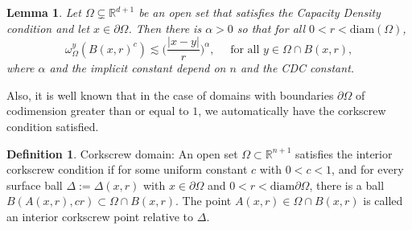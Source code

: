 \documentclass{article}
\newcounter{defn}
\newcounter{lem}
\theoremstyle{plain}
\theoremstyle{plain}
\newcommand{\R}{\mathbb{R}}
\newtheorem{lemma}[theorem]{Lemma}
\theoremstyle{definition}
\newtheorem{definition}[defn]{Definition}
\theoremstyle{plain}
\begin{document}
\begin{lemma} \label{l:holder}
Let $\Omega\subsetneq \R^{d+1}$ be an open set that satisfies the Capacity Density condition and let $x\in \partial\Omega$. Then there is $\alpha>0$ so that for all $0<r<\text{diam}(\Omega)$,
\begin{equation}\label{e:holder}
 \omega_{\Omega}^{y}({B}(x,r)^{c})\lesssim \Big({\frac{|x-y|}{r}}\Big)^{\alpha},\quad \mbox{ for all } y\in \Omega\cap B(x,r),
 \end{equation}
where $\alpha$ and the implicit constant depend on $n$ and the CDC constant.
\end{lemma}

Also, it is well known that in the case of domains with boundaries $\partial\Omega$ of codimension greater than or equal to $1$, we automatically have the corkscrew condition satisfied.

\begin{definition}\label{def1}
    Corkscrew domain:  An open set $\Omega\subset \R^{n+1}$ satisfies the interior corkscrew condition if for some uniform constant $c$ with $0<c<1$, and for every surface ball $\Delta:=\Delta(x,r)$ with $x\in \partial \Omega$ and $0<r<\text{diam}\partial\Omega$, there is a ball $B(A(x,r),cr)\subset \Omega\cap B(x,r)$. The point $A(x,r)\in \Omega\cap B(x,r)$
 is called an interior corkscrew point relative to $\Delta$.
 \end{definition}



%
%
%
\end{document}
